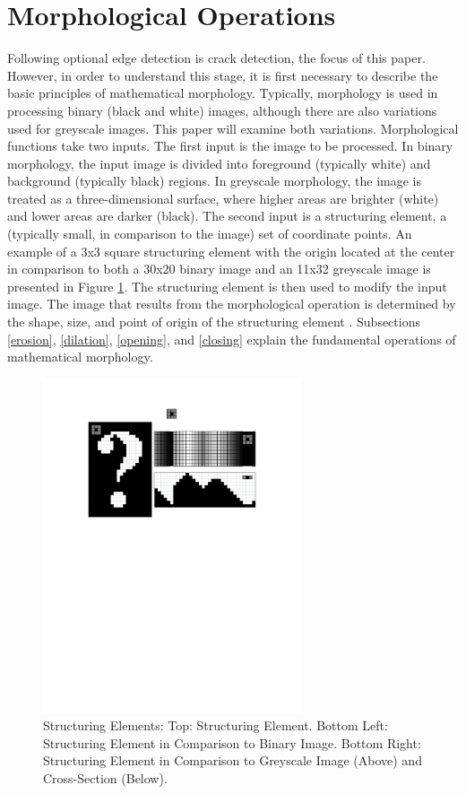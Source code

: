 \documentclass{sig-alternate}
\begin{document}
\section{Morphological Operations}\label{morphological operations}
Following optional edge detection is crack detection, the focus of this paper. However, in order to understand this stage, it is first necessary to describe the basic principles of mathematical morphology. Typically, morphology is used in processing binary (black and white) images, although there are also variations used for greyscale images. This paper will examine both variations. Morphological functions take two inputs. The first input is the image to be processed. In binary morphology, the input image is divided into foreground (typically white) and background (typically black) regions. In greyscale morphology, the image is treated as a three-dimensional surface, where higher areas are brighter (white) and lower areas are darker (black). The second input is a structuring element, a (typically small, in comparison to the image) set of coordinate points. An example of a 3x3 square structuring element with the origin located at the center in comparison to both a 30x20 binary image and an 11x32 greyscale image is presented in Figure \ref{structuring element figure}. The structuring element is then used to modify the input image. The image that results from the morphological operation is determined by the shape, size, and point of origin of the structuring element \cite{MorphologyWikiAnonymous, MorphologyBook:2000, MorphologyPaper:1987, MorphologyWiki}. Subsections \ref{erosion}, \ref{dilation}, \ref{opening}, and \ref{closing} explain the fundamental operations of mathematical morphology.
\begin{figure}
\centering
\includegraphics[width=3in,trim={0 6.5in 0 0},clip]{structuring_element}
\caption{Structuring Elements: Top: Structuring Element. Bottom Left: Structuring Element in Comparison to Binary Image. Bottom Right: Structuring Element in Comparison to Greyscale Image (Above) and Cross-Section (Below).}
\label{structuring element figure}
\end{figure}
\end{document}
